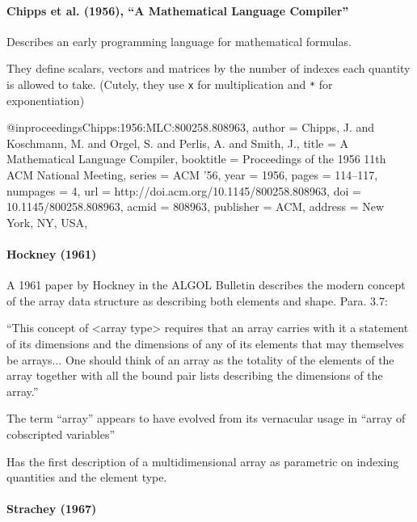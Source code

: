 \paragraph{Chipps et al. (1956), ``A Mathematical Language Compiler''}

Describes an early programming language for mathematical formulas.

They define scalars, vectors and matrices by the number of indexes each quantity
is allowed to take. (Cutely, they use \lstinline|x| for multiplication and
\lstinline|*| for exponentiation)

@inproceedings{Chipps:1956:MLC:800258.808963,
 author = {Chipps, J. and Koschmann, M. and Orgel, S. and Perlis, A. and Smith, J.},
 title = {A Mathematical Language Compiler},
 booktitle = {Proceedings of the 1956 11th ACM National Meeting},
 series = {ACM '56},
 year = {1956},
 pages = {114--117},
 numpages = {4},
 url = {http://doi.acm.org/10.1145/800258.808963},
 doi = {10.1145/800258.808963},
 acmid = {808963},
 publisher = {ACM},
 address = {New York, NY, USA},
}



\paragraph{Hockney (1961)~\cite{Hockney1961}}

A 1961 paper by Hockney in the ALGOL Bulletin
describes the modern concept of the array data structure as describing
both elements and shape. Para. 3.7:

``This concept of <array type> requires that an array carries with it a
statement of its dimensions and the dimensions of any of its elements
that may themselves be arrays... One should think of an array as the
totality of the elements of the array together with all the bound pair
lists describing the dimensions of the array.''

The term ``array'' appears to have evolved from its vernacular usage in ``array of cobscripted variables''

Has the first description of a multidimensional array as parametric on indexing quantities and the element type.


\paragraph{Strachey (1967)~\cite{Strachey1967}}

